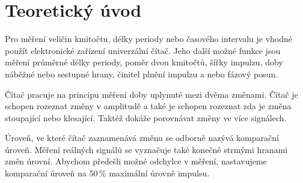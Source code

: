\documentclass[a4paper, czech]{article}
\begin{document}
\section{Teoretický úvod}

Pro měření veličin kmitočtu, délky periody nebo časového intervalu je vhodné použít elektronické zařízení univerzální čítač.
Jeho další možné funkce jsou měření průměrné délky periody, poměr dvou kmitočtů, šířky impulzu, doby náběžné nebo sestupné hrany, činitel plnění impulzu a nebo fázový posun.

Čítač pracuje na principu měření doby uplynuté mezi dvěma změnami.
Čítač je schopen rozeznat změny v amplitudě a také je schopen rozeznat zda je změna stoupající nebo klesající.
Taktéž dokáže porovnávat změny ve více signálech.

Úroveň, ve které čítač zaznamenává změnu se odborně nazývá komparační úroveň.
Měření reálných signálů se vyznačuje také konečně strmými hranami změn úrovní.
Abychom předešli možné odchylce v měření, nastavujeme komparační úroveň na 50\,\%
maximální úrovně impulsu.
\end{document}
